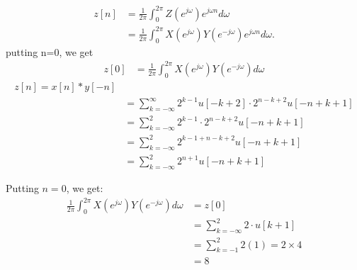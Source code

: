 \documentclass[journal,12pt,twocolumn]{IEEEtran}
\theoremstyle{remark}
\begin{document}
\begin{align}
      z[n]& =\frac{1}{2\pi} \int_{0}^{2\pi} Z(e^{j\omega})e^{j \omega n} d\omega \\
      &=\frac{1}{2\pi} \int_{0}^{2\pi}  X(e^{j\omega}) Y(e^{-j\omega})e^{j \omega n} d\omega.
 \end{align}
 putting  n=0, we get
\begin{align}
    z[0]&=\frac{1}{2\pi} \int_{0}^{2\pi} X(e^{j\omega}) Y(e^{-j\omega}) d\omega
\end{align}
\begin{align}
    z[n] = x[n] * y[-n]\\
 &= \sum_{k=-\infty}^{\infty} 2^{k-1} u[-k+2]\cdot 2^{n-k+2} u[-n+k+1]\\
 &= \sum_{k=-\infty}^{2} 2^{k-1} \cdot 2^{n-k+2} u[-n+k+1]\\
 &= \sum_{k=-\infty}^{2} 2^{k-1+n-k+2} u[-n+k+1]\\
 &= \sum_{k=-\infty}^{2} 2^{n+1} u[-n+k+1]
\end{align}

Putting $n = 0$, we get:
\begin{align}
     \frac{1}{2\pi} \int_{0}^{2\pi} X(e^{j\omega}) Y(e^{-j\omega}) d\omega &= z[0]\\
     &= \sum_{k=-\infty}^{2} 2 \cdot u[k+1] \\
     &=\sum_{k=-1}^{2} 2(1) = 2 \times 4 \\
     &= 8
\end{align}
\end{document}
